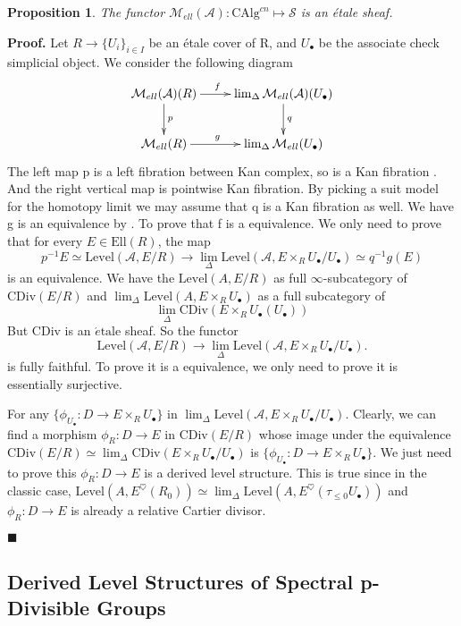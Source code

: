 \documentclass[12pt]{article}
\newtheorem{proposition}[theorem]{Proposition}
\theoremstyle{thry}
\renewenvironment{proof}
{\par \noindent \textbf{Proof.}}
{ \par \hfill $\blacksquare$ \quad \par }
\def  \CAlg     {\mathrm{CAlg}}
\def  \etale    {\acute{e}\text{tale}}
\def  \CDiv     {\mathrm{CDiv}}
\def  \Ell      {\mathrm{Ell}}
\def  \Level    {\mathrm{Level}}
\def  \ca       {\mathcal{A}}
\def  \cm       {\mathcal{M}}
\def  \cs       {\mathcal{S}}
\begin{document}
\begin{proposition}
	The functor $\cm_{ell}(\ca): \CAlg^{cn}  \mapsto  \cs$ is an \'etale sheaf. 
\end{proposition}
\begin{proof}
	Let $R \to \{{U_i}\}_{i \in I}$ be an \'etale cover of R, and $U_{\bullet}$ be the associate check simplicial object.
	We consider the following diagram
	$$
	\xymatrix{
		\cm_{ell}(\ca)(R)  \ar[r]^{f \quad }  \ar[d]^{p}  &   \lim_{\Delta} \cm_{ell}(\ca)(U_{\bullet})  \ar[d]^{q}  \\
		\cm_{ell}(R)  \ar[r]^{g \quad}    &   \lim_{\Delta} \cm_{ell}(U_{\bullet})  \\
	}
	$$
	The left map p is  a left  fibration between Kan complex, so is a  Kan fibration \cite[Lemma 2.1.3.3]{lu-HTT}. And the right vertical map is pointwise Kan fibration. By picking a suit model for the homotopy limit we may assume that q is a Kan fibration as well.  We have g is an equivalence by \cite[Lemma 2.4.1]{lu-EC1}. To prove that f is a equivalence. We only need to prove that for every $E \in \Ell(R)$, the map
	$$
	p^{-1}{E} \simeq  \Level(\ca , E/R)   \to   \lim_{\Delta} \Level (\ca, E \times_R  U_{\bullet}/U_{\bullet}) \simeq q^{-1}g(E)
	$$
	is an equivalence. We have the $\Level(A, E/R)$ as full $\infty$-subcategory of $\CDiv(E/R)$ and
	$  \lim_{\Delta} \Level(A, E \times_R U_{\bullet})$ as a full subcategory of  
	$$
	\lim_{\Delta} \CDiv( E \times_R U_{\bullet}(U_{\bullet})) 
	$$
	But $\CDiv$ is an $\etale$ sheaf. So the functor
	$$
	\Level(\ca,E/R) \to   \lim_{\Delta} \Level(\ca, E \times_R U_{\bullet}/U_{\bullet}).
	$$
	is fully faithful. To prove it is a equivalence, we only need to prove it is essentially surjective.
	
	For any  $\{\phi_{U_{\bullet}}: D \to E \times_R {U_{\bullet}}\}$  in $\lim_{\Delta} \Level(\ca, E \times_R U_{\bullet}/U_{\bullet})$.  Clearly, we can find a morphism $\phi_R: D \to E$  in $\CDiv(E/R)$  whose image under the equivalence $\CDiv(E/R) \simeq  \lim_{\Delta}\CDiv( E \times _R U_{\bullet}/U_{\bullet})$ is $\{\phi_{U_{\bullet}}: D \to E \times_R U_{\bullet}\}$. We just need to prove this  $\phi_R: D \to E $ is a derived level structure. This is true since in the classic case, $\Level(A, E^{\heartsuit}(R_0)) \simeq  \lim_{\Delta}\Level(A, E^{\heartsuit}( \tau_{\leq 0}U_{\bullet}))$ and $\phi_R: D \to E$ is already a relative Cartier divisor.
\end{proof}




\subsection{Derived Level Structures of Spectral p-Divisible Groups}
\end{document}
